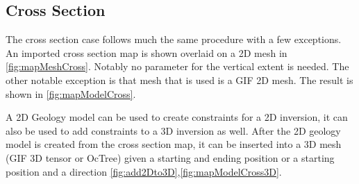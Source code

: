 \subsection{Cross Section}
\label{subsec:Make Geology Model from Map Cross Section}

The cross section case follows much the same procedure with a few exceptions. An imported cross section map is shown overlaid on a 2D mesh in \autoref{fig:mapMeshCross}. Notably no parameter for the vertical extent is needed. The other notable exception is that mesh that is used is a \ac{GIF} 2D mesh. The result is shown in \autoref{fig:mapModelCross}.  

A 2D Geology model can be used to create constraints for a 2D inversion, it can also be used to add constraints to a 3D inversion as well. After the 2D geology model is created from the cross section map, it can be inserted into a 3D mesh (\ac{GIF} 3D tensor or OcTree) given a starting and ending position or a starting position and a direction \autoref{fig:add2Dto3D},\autoref{fig:mapModelCross3D}.

